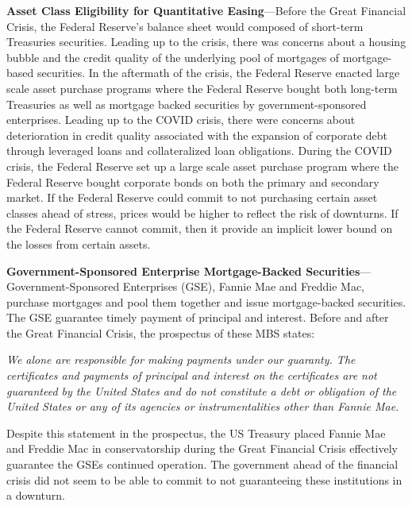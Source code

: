 \documentclass{article}
\begin{document}
\textbf{Asset Class Eligibility for Quantitative Easing}---Before the Great Financial Crisis, the Federal Reserve's balance sheet would composed of short-term Treasuries securities. Leading up to the crisis, there was concerns about a housing bubble and the credit quality of the underlying pool of mortgages of mortgage-based securities. In the aftermath of the crisis, the Federal Reserve enacted large scale asset purchase programs where the Federal Reserve bought both long-term Treasuries as well as mortgage backed securities by government-sponsored enterprises.  Leading up to the COVID crisis, there were concerns about deterioration in credit quality associated with the expansion of corporate debt through leveraged loans and collateralized loan obligations.  During the COVID crisis, the Federal Reserve set up a large scale asset purchase program where the Federal Reserve bought corporate bonds on both the primary and secondary market.  If the Federal Reserve could commit to not purchasing certain asset classes ahead of stress, prices would be higher to reflect the risk of downturns.  If the Federal Reserve cannot commit, then it provide an implicit lower bound on the losses from certain assets.

\textbf{Government-Sponsored Enterprise Mortgage-Backed Securities}---Government-Sponsored Enterprises (GSE), Fannie Mae and Freddie Mac, purchase mortgages and pool them together and issue mortgage-backed securities.  The GSE guarantee timely payment of principal and interest.  Before and after the Great Financial Crisis, the prospectus of these MBS states:

\textit{We alone are responsible for making payments under our guaranty. The certificates and payments of principal and interest on the certificates are not guaranteed by the United States and do not constitute a debt or obligation of the United States or any of its agencies or instrumentalities other than Fannie Mae.}

Despite this statement in the prospectus, the US Treasury placed Fannie Mae and Freddie Mac in conservatorship during the Great Financial Crisis effectively guarantee the GSEs continued operation.  The government ahead of the financial crisis did not seem to be able to commit to not guaranteeing these institutions in a downturn.
\end{document}
